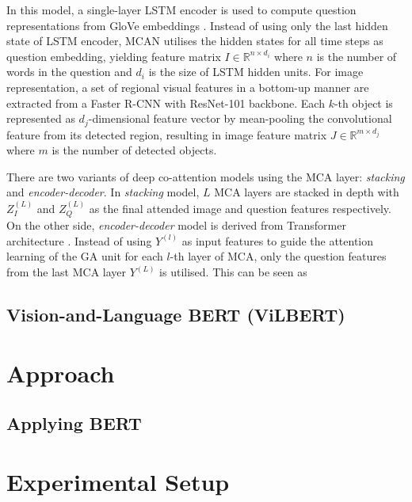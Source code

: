 \documentclass{article}
\begin{document}
In this model, a single-layer LSTM encoder \citep{lstm} is used to compute question representations from GloVe embeddings \citep{pennington2014glove}. Instead of using only the last hidden state of LSTM encoder, MCAN utilises the hidden states for all time steps as question embedding, yielding feature matrix $I \in \mathbb{R}^{n \times d_{i}}$ where $n$ is the number of words in the question and $d_{i}$ is the size of LSTM hidden units. For image representation, a set of regional visual features in a bottom-up manner \citep{Anderson_2018_CVPR} are extracted from a Faster R-CNN \citep{faster_rcnn} with ResNet-101 backbone. Each $k$-th object is represented as $d_{j}$-dimensional feature vector by mean-pooling the convolutional feature from its detected region, resulting in image feature matrix $J \in \mathbb{R}^{m \times d_{j}}$ where $m$ is the number of detected objects.

There are two variants of deep co-attention models using the MCA layer: \textit{stacking} and \textit{encoder-decoder}. In \textit{stacking} model, $L$ MCA layers are stacked in depth with $Z_{I}^{(L)}$ and $Z_{Q}^{(L)}$ as the final attended image and question features respectively. On the other side, \textit{encoder-decoder} model is derived from Transformer architecture \citep{transformers}. Instead of using $Y^{(l)}$ as input features to guide the attention learning of the GA unit for each $l$-th layer of MCA, only the question features from the last MCA layer $Y^{(L)}$ is utilised. This can be seen as 

\subsection{Vision-and-Language BERT (ViLBERT)}

\section{Approach}
\subsection{Applying BERT}

\section{Experimental Setup}
\end{document}
